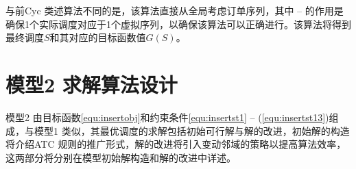 与前Cyc 类述算法不同的是，该算法直接从全局考虑订单序列，其中 -- 的作用是确保1个实际调度对应于1个虚拟序列，以确保该算法可以正确进行。该算法将得到最终调度$S$和其对应的目标函数值$G(S)$。 




\section{模型2 求解算法设计}
模型2 由目标函数\eqref{equ:insertobj}和约束条件\eqref{equ:insertst1} -- (\ref{equ:insertst13})组成，与模型1 类似，其最优调度的求解包括初始可行解与解的改进，初始解的构造将介绍ATC 规则的推广形式，解的改进将引入变动邻域的策略以提高算法效率，这两部分将分别在模型初始解构造和解的改进中详述。
